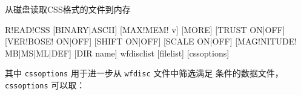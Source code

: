 \label{cmd:readcss}

从磁盘读取CSS格式的文件到内存

\begin{SACSTX}
R!EAD!CSS [BINARY|ASCII] [MAX!MEM! v] [MORE] [TRUST ON|OFF]
    [VER!BOSE! ON|OFF] [SHIFT ON|OFF] [SCALE ON|OFF]
    [MAG!NITUDE! MB|MS|ML|DEF] [DIR name] wfdisclist [filelist]
    [cssoptions]
\end{SACSTX}
其中 \texttt{cssoptions} 用于进一步从 \texttt{wfdisc} 文件中筛选满足
条件的数据文件，\texttt{cssoptions} 可以取：
\begin{SACSTX}
\end{SACSTX}

